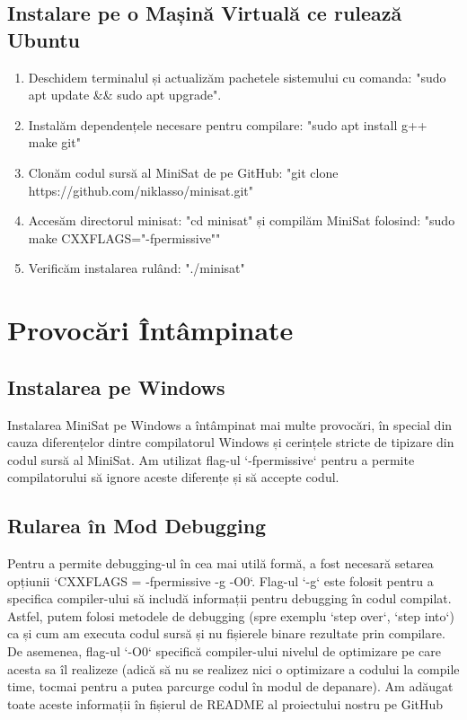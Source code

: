 \documentclass{llncs}
\begin{document}
\subsection{Instalare pe o Mașină Virtuală ce rulează Ubuntu}
\begin{enumerate}
    \item Deschidem terminalul și actualizăm pachetele sistemului cu comanda: "sudo apt update \&\& sudo apt upgrade".
    \item Instalăm dependențele necesare pentru compilare: "sudo apt install g++ make git"
    \item Clonăm codul sursă al MiniSat de pe GitHub: "git clone https://github.com/niklasso/minisat.git"
    \item Accesăm directorul minisat: "cd minisat" și compilăm MiniSat folosind: "sudo make CXXFLAGS="-fpermissive""
    \item Verificăm instalarea rulând: "./minisat"
\end{enumerate}

\section{Provocări Întâmpinate}

\subsection{Instalarea pe Windows}

Instalarea MiniSat pe Windows a întâmpinat mai multe provocări, în special din cauza diferențelor dintre compilatorul Windows și cerințele stricte de tipizare din codul sursă al MiniSat. Am utilizat flag-ul `-fpermissive` pentru a permite compilatorului să ignore aceste diferențe și să accepte codul.

\subsection{Rularea în Mod Debugging}

Pentru a permite debugging-ul în cea mai utilă formă, a fost necesară setarea opțiunii `CXXFLAGS = -fpermissive -g -O0`. Flag-ul `-g` este folosit pentru a specifica compiler-ului să includă informații pentru debugging în codul compilat. Astfel, putem folosi metodele de debugging (spre exemplu `step over`, `step into`) ca și cum am executa codul sursă și nu fișierele binare rezultate prin compilare. De asemenea, flag-ul `-O0` specifică compiler-ului nivelul de optimizare pe care acesta sa îl realizeze (adică să nu se realizez nici o optimizare a codului la compile time, tocmai pentru a putea parcurge codul în modul de depanare). Am adăugat toate aceste informații în fișierul de README al proiectului nostru pe GitHub\cite{ref_MiniSat_our_fork}
\end{document}
